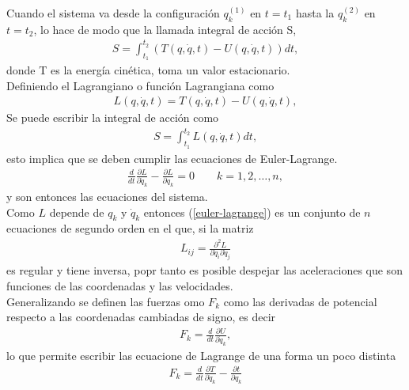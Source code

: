 \documentclass[letterpaper,12pt,oneside]{book}
\begin{document}
Cuando el sistema va desde la configuraci\'on $q_k^{(1)}$ en $t=t_1$ hasta la $q_k^{(2)}$ en $t=t_2$, lo hace de modo que la llamada integral de acci\'on S,
%
\begin{eqnarray}
S=\int_{t_1}^{t_2} \left(T(q,\dot q, t)-U(q,\dot q, t)\right)dt,
\end{eqnarray}
%
donde T es la energ\'ia cin\'etica, toma un valor estacionario.\\
%
Definiendo el Lagrangiano o funci\'on Lagrangiana como 
%
\begin{eqnarray}
L(q,\dot q, t)=T(q,\dot q, t)-U(q,\dot q, t),
\end{eqnarray}
%
Se puede escribir la integral de acci\'on como 
%
\begin{eqnarray}
S=\int_{t_1}^{t_2} L(q,\dot q, t)dt,
\end{eqnarray}
%
esto implica que se deben cumplir las ecuaciones de Euler-Lagrange. 
%
\begin{eqnarray}
\frac{d}{dt}\frac{\partial L}{\partial \dot q_k}-\frac{\partial L}{\partial q_k}=0 \qquad k=1,2,\dots ,n, \label{euler-lagrange}
\end{eqnarray}
%
y son entonces las ecuaciones del sistema. \\
%
Como $L$ depende de $q_k$ y $\dot q_k$ entonces (\ref{euler-lagrange}) es un conjunto de $n$ ecuaciones de segundo orden en el que, si la matriz
%
\begin{eqnarray}
L_{ij}=\frac{\partial^2 L}{\partial \dot q_i \partial \dot q_j}
\end{eqnarray}
%
es regular y tiene inversa, popr tanto es posible despejar las aceleraciones que son funciones de las coordenadas y las velocidades. \\
Generalizando se definen las fuerzas omo $F_k$ como las derivadas de potencial respecto a las coordenadas cambiadas de signo, es decir
%
\begin{eqnarray}
F_k= \frac{d}{dt}\frac{\partial U}{\partial \dot q_k},
\end{eqnarray}
%
lo que permite escribir las ecuacione de Lagrange de una forma un poco distinta
%
\begin{eqnarray}
F_k= \frac{d}{dt}\frac{\partial T}{\partial \dot q_k}-\frac{\partial t}{\partial q_k}
\end{eqnarray}
%
\end{document}
